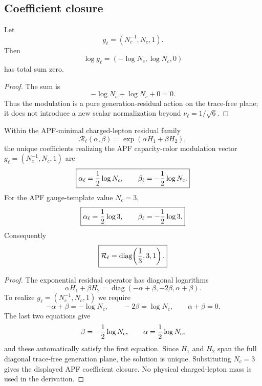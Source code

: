 \subsection{Coefficient closure}

\begin{lemma}
Let
\[
        g_\ell=(N_c^{-1},N_c,1).
\]
Then
\[
        \log g_\ell=(-\log N_c,\log N_c,0)
\]
has total sum zero.
\end{lemma}

\begin{proof}
The sum is
\[
        -\log N_c+\log N_c+0=0.
\]
Thus the modulation is a pure generation-residual action on the trace-free
plane; it does not introduce a new scalar normalization beyond
$\nu_\ell=1/\sqrt6$.
\end{proof}

\begin{theorem}
\label{thm:charged-lepton-coefficient-closure-v39}
Within the APF-minimal charged-lepton residual family
\[
        \mathcal R_\ell(\alpha,\beta)
        =\exp\!\left(\alpha H_1+\beta H_2\right),
\]
the unique coefficients realizing the APF capacity-color modulation vector
$g_\ell=(N_c^{-1},N_c,1)$ are
\[
        \boxed{\alpha_\ell={1\over2}\log N_c,
        \qquad
        \beta_\ell=-{1\over2}\log N_c.}
\]
For the APF gauge-template value $N_c=3$,
\[
        \boxed{\alpha_\ell={1\over2}\log 3,
        \qquad
        \beta_\ell=-{1\over2}\log 3.}
\]
Consequently
\[
        \boxed{\mathcal R_\ell
        =\operatorname{diag}\!\left({1\over3},3,1\right).}
\]
\end{theorem}

\begin{proof}
The exponential residual operator has diagonal logarithms
\[
\alpha H_1+\beta H_2
 =\operatorname{diag}(-\alpha+\beta,-2\beta,\alpha+\beta).
\]
To realize $g_\ell=(N_c^{-1},N_c,1)$ we require
\[
        -\alpha+\beta=-\log N_c,
        \qquad
        -2\beta=\log N_c,
        \qquad
        \alpha+\beta=0.
\]
The last two equations give
\[
        \beta=-{1\over2}\log N_c,
        \qquad
        \alpha={1\over2}\log N_c,
\]
and these automatically satisfy the first equation.  Since $H_1$ and $H_2$
span the full diagonal trace-free generation plane, the solution is unique.
Substituting $N_c=3$ gives the displayed APF coefficient closure.  No physical
charged-lepton mass is used in the derivation.
\end{proof}

